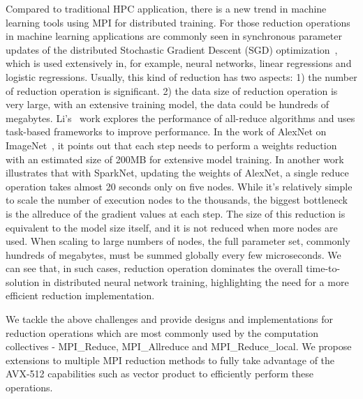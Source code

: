 \documentclass[sigconf]{acmart}
\newcommand{\mpi}[0]{\textsc{MPI}\xspace}
\begin{document}
Compared to traditional HPC application, there is a new trend in machine learning tools
using \mpi for distributed training. For those reduction operations in machine learning applications
are commonly seen in synchronous parameter updates of the distributed Stochastic
Gradient Descent (SGD) optimization~\cite{sgd10}, which is used extensively
in, for example, neural networks, linear regressions and logistic
regressions. Usually, this kind of reduction has two aspects: 1) the number of reduction
operation is significant. 2) the data size of reduction operation is very large, with an extensive training model,
the data could be hundreds of megabytes.
Li's~\cite{inproceedings} work explores the performance of all-reduce algorithms
and uses task-based frameworks to improve performance.
In the work of AlexNet on ImageNet~\cite{NIPS2012_4824}, it points out that
each step needs to perform a weights reduction with an estimated size
of 200MB for extensive model training. In another work~\cite{moritz2015sparknet}
illustrates that with SparkNet, updating the weights of AlexNet, a single reduce
operation takes almost 20 seconds only on five nodes. While it's relatively simple to scale
the number of execution nodes to the thousands, the biggest bottleneck is the allreduce of
the gradient values at each step. The size of this reduction is equivalent
to the model size itself, and it is not reduced when more
nodes are used. When scaling to large numbers of nodes, the full parameter set, commonly hundreds of
megabytes, must be summed globally every few microseconds. We can see that, in such cases,
reduction operation dominates the overall time-to-solution in distributed neural network
training, highlighting the need for a more efficient reduction implementation.

We tackle the above challenges and provide designs and implementations
for reduction operations which are most commonly used by the computation
collectives - MPI\_Reduce, MPI\_Allreduce and MPI\_Reduce\_local.
We propose extensions to multiple \mpi reduction methods to fully take
advantage of the AVX-512 capabilities such as vector product to efficiently
perform these operations.
\end{document}
